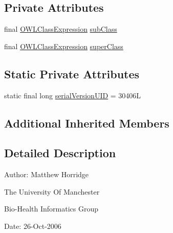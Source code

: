 \subsection*{Private Attributes}
\begin{DoxyCompactItemize}
\item 
final \hyperlink{interfaceorg_1_1semanticweb_1_1owlapi_1_1model_1_1_o_w_l_class_expression}{O\-W\-L\-Class\-Expression} \hyperlink{classuk_1_1ac_1_1manchester_1_1cs_1_1owl_1_1owlapi_1_1_o_w_l_sub_class_of_axiom_impl_ada3c83d9b2659089fe9fa76ae4f02618}{sub\-Class}
\item 
final \hyperlink{interfaceorg_1_1semanticweb_1_1owlapi_1_1model_1_1_o_w_l_class_expression}{O\-W\-L\-Class\-Expression} \hyperlink{classuk_1_1ac_1_1manchester_1_1cs_1_1owl_1_1owlapi_1_1_o_w_l_sub_class_of_axiom_impl_a84b65e43d23b9f6b6932e828bf45a0bb}{super\-Class}
\end{DoxyCompactItemize}
\subsection*{Static Private Attributes}
\begin{DoxyCompactItemize}
\item 
static final long \hyperlink{classuk_1_1ac_1_1manchester_1_1cs_1_1owl_1_1owlapi_1_1_o_w_l_sub_class_of_axiom_impl_a1143d60a832d27426697b9e55fbfc13e}{serial\-Version\-U\-I\-D} = 30406\-L
\end{DoxyCompactItemize}
\subsection*{Additional Inherited Members}


\subsection{Detailed Description}
Author\-: Matthew Horridge\par
 The University Of Manchester\par
 Bio-\/\-Health Informatics Group\par
 Date\-: 26-\/\-Oct-\/2006\par
\par
 

